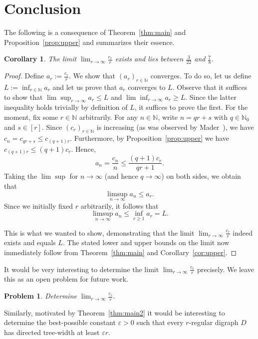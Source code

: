 \documentclass[a4paper,10pt]{article}
\newtheorem{corollary}[theorem]{Corollary}
\newtheorem{problem}{Problem}
\begin{document}
\section{Conclusion}\label{sec:conc}
The following  is a consequence of Theorem~\ref{thm:main} and Proposition~\ref{prop:upper} and summarizes their essence.
\begin{corollary}
The limit $\lim_{r\rightarrow \infty}\frac{c_r}{r}$ exists and lies between $\frac{3}{22}$ and $\frac{7}{8}$.
\end{corollary}
\begin{proof}
Define $a_r := \frac{c_r}{r}$. We show that $(a_r)_{r\in \mathbb{N}}$ converges. To do so, let us define $L:=\inf_{r\in \mathbb{N} }a_r$ and let us prove that $a_r$ converges to $L$. Observe that it suffices to show that $\lim\sup_{r\rightarrow \infty}a_r\le L$ and $\lim\inf_{r\rightarrow \infty}a_r\ge L$. Since the latter inequality holds trivially by definition of $L$, it suffices to prove the first. For the moment, fix some $r \in \mathbb{N}$ arbitrarily. For any $n \in \mathbb{N}$, write $n = qr + s$ with $q\in \mathbb{N}_0$ and $s\in [r]$. Since $(c_r)_{r\in \mathbb{N}}$ is increasing (as was observed by Mader~\cite{MR2588727}), we have
$
c_n = c_{qr + s} \le c_{(q+1)r}.
$
Furthermore, by Proposition~\ref{prop:upper} we have
$
c_{(q+1)r} \le (q+1)c_r.
$
Hence,
\[
a_n = \frac{c_n}{n} \le \frac{(q+1)c_r}{qr+1}.
\]
Taking the $\lim\sup$ for $n\rightarrow\infty$ (and hence $q\rightarrow \infty$) on both sides, we obtain that
\[
\limsup_{n \to \infty} a_n \le a_r.
\]
Since we initially fixed $r$ arbitrarily, it follows that
\[
\limsup_{n \to \infty} a_n \le \inf_{r \ge 1} a_r = L.
\]

This is what we wanted to show, demonstrating that the limit $\lim_{r\rightarrow \infty}\frac{c_r}{r}$ indeed exists and equals $L$. The stated lower and upper bounds on the limit now immediately follow from Theorem~\ref{thm:main} and Corollary~\ref{cor:upper}.
\end{proof}
It would be very interesting to determine the limit $\lim_{r\rightarrow\infty}\frac{c_r}{r}$ precisely. We leave this as an open problem for future work.
\begin{problem}
    Determine $\lim_{r\rightarrow\infty} \frac{c_r}{r}$.
\end{problem}
Similarly, motivated by Theorem~\ref{thm:main2} it would be interesting to determine the best-possible constant $\varepsilon>0$ such that every $r$-regular digraph $D$ has directed tree-width at least $\varepsilon r$. 


\end{document}
